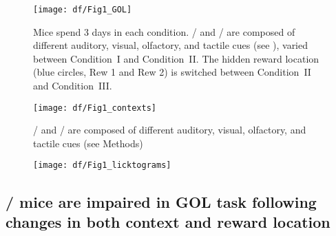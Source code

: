 \begin{figure}
	\centering
	\texttt{[image: df/Fig1\_GOL]}
	\caption[The three conditions of the GOL task]{Mice spend 3 days in each condition. \A/ and \Aprime/ are composed of different auditory, visual, olfactory, and tactile cues (see ), varied between Condition~I and Condition~II. The hidden reward location (blue circles, Rew 1 and Rew 2) is switched between Condition~II and Condition~III.}
	\label{fig:df:GOL}
\end{figure}

\begin{figure}
	\centering
	\texttt{[image: df/Fig1\_contexts]}
	\caption[Components of the two distinct contexts used in the GOL task]{\A/ and \Aprime/ are composed of different auditory, visual, olfactory, and tactile cues (see Methods)}
	\label{fig:df:contexts}
\end{figure}

\begin{figure}
	\centering
	\texttt{[image: df/Fig1\_licktograms]}
	\caption{}
	\label{fig:df:licktograms}
\end{figure}

\subsection{\df/ mice are impaired in GOL task following changes in both context and reward location}

